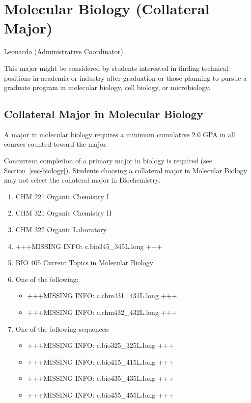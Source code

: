 \documentclass[
  letterpaper,
]{scrbook}
\providecommand{\tightlist}{%
  \setlength{\itemsep}{0pt}\setlength{\parskip}{0pt}}
\begin{document}
\section{Molecular Biology (Collateral
Major)}\label{sec-molecular-biology}

Leonardo (Administrative Coordinator).

This major might be considered by students interested in finding
technical positions in academia or industry after graduation or those
planning to pursue a graduate program in molecular biology, cell
biology, or microbiology.

\subsection{Collateral Major in Molecular
Biology}\label{collateral-major-in-molecular-biology}

A major in molecular biology requires a minimum cumulative 2.0 GPA in
all courses counted toward the major.

Concurrent completion of a primary major in biology is required (see
Section~\ref{sec-biology}). Students choosing a collateral major in
Molecular Biology may not select the collateral major in Biochemistry.

\begin{enumerate}
\def\labelenumi{\arabic{enumi}.}
\tightlist
\item
  CHM 221 Organic Chemistry I
\item
  CHM 321 Organic Chemistry II
\item
  CHM 322 Organic Laboratory
\item
  +++MISSING INFO: c.bio345\_345L.long +++
\item
  BIO 405 Current Topics in Molecular Biology
\item
  One of the following:

  \begin{itemize}
  \tightlist
  \item
    +++MISSING INFO: c.chm431\_431L.long +++
  \item
    +++MISSING INFO: c.chm432\_432L.long +++
  \end{itemize}
\item
  One of the following sequences:

  \begin{itemize}
  \tightlist
  \item
    +++MISSING INFO: c.bio325\_325L.long +++
  \item
    +++MISSING INFO: c.bio415\_415L.long +++
  \item
    +++MISSING INFO: c.bio435\_435L.long +++
  \item
    +++MISSING INFO: c.bio455\_455L.long +++
  \end{itemize}
\end{enumerate}
\end{document}
